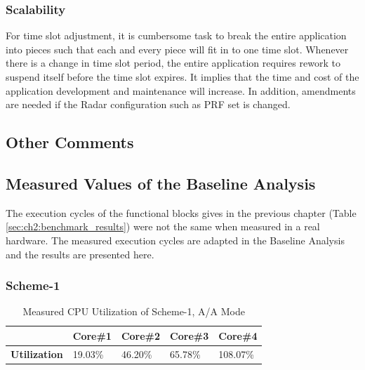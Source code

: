 \subsubsection{Scalability}
\label{sss:mm:cons:scalability}
For time slot adjustment, it is cumbersome task to break the entire application into pieces such that each and every piece will fit in to one time slot. Whenever there is a change in time slot period, the entire application requires rework to suspend itself before the time slot expires. It implies that the time and cost of the application development and maintenance will increase. In addition, amendments are needed if the Radar configuration such as PRF set is changed.

\subsection{Other Comments}
\subsection{Measured Values of the Baseline Analysis}
\label{mm:cons:real_values}
The execution cycles of the functional blocks gives in the previous chapter (Table \ref{sec:ch2:benchmark_results}) were not the same when measured in a real hardware. The measured execution cycles are adapted in the Baseline Analysis and the results are presented here.

\subsubsection{Scheme-1}
\begin{table}[h!]
	\centering
	\begin{tabular}{|l|l|l|l|l|} 
	 \hline
	& \textbf{Core\#1} & \textbf{Core\#2} & \textbf{Core\#3} & \textbf{Core\#4} \\ \hline
	\textbf{Utilization} & 19.03\% & 46.20\% & 65.78\% & {\color{red} 108.07\%} \\ \hline
	\end{tabular}
	\caption{Measured CPU Utilization of Scheme-1, A/A Mode}
	\label{tbl:mm:scheme1_true_util}
\end{table}

